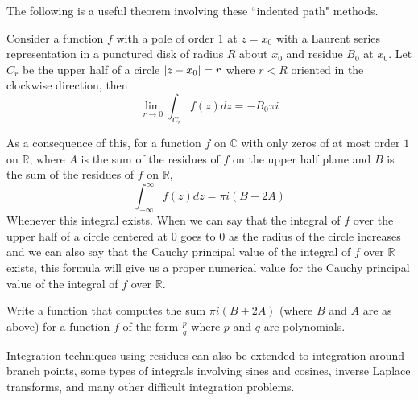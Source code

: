 The following is a useful theorem involving these ``indented path" methods.
\begin{theorem}
Consider a function $f$ with a pole of order $1$ at $z=x_0$ with a Laurent series representation in a punctured disk of radius $R$ about $x_0$ and residue $B_0$ at $x_0$.
Let $C_r$ be the upper half of a circle $\left\lvert z-x_0\right\rvert=r$ where $r<R$ oriented in the clockwise direction, then
\[\lim_{r\to 0} \int_{C_r} f(z) dz = - B_0 \pi i\]
\end{theorem}
As a consequence of this, for a function $f$ on $\mathbb{C}$ with only zeros of at most order $1$ on $\mathbb{R}$, where $A$ is the sum of the residues of $f$ on the upper half plane and $B$ is the sum of the residues of $f$ on $\mathbb{R}$,
\[\int_{-\infty}^{\infty} f(z) dz = \pi i (B+2A)\]
Whenever this integral exists.
When we can say that the integral of $f$ over the upper half of a circle centered at $0$ goes to $0$ as the radius of the circle increases and we can also say that the Cauchy principal value of the integral of $f$ over $\mathbb{R}$ exists, this formula will give us a proper numerical value for the Cauchy principal value of the integral of $f$ over $\mathbb{R}$.

\begin{problem}
Write a function that computes the sum $\pi i \left(B + 2 A\right)$ (where $B$ and $A$ are as above) for a function $f$ of the form $\frac{p}{q}$ where $p$ and $q$ are polynomials.
\end{problem}

Integration techniques using residues can also be extended to integration around branch points, some types of integrals involving sines and cosines, inverse Laplace transforms, and many other difficult integration problems.
